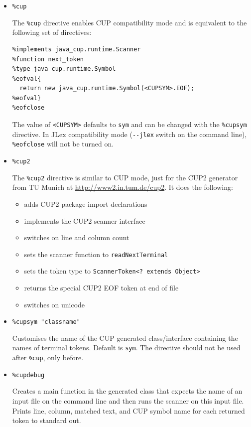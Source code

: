 \begin{itemize}
\item
  \texttt{\%cup}

  The \texttt{\%cup} directive enables CUP compatibility mode and is
  equivalent to the following set of directives:

\begin{verbatim}
%implements java_cup.runtime.Scanner
%function next_token
%type java_cup.runtime.Symbol
%eofval{
  return new java_cup.runtime.Symbol(<CUPSYM>.EOF);
%eofval}
%eofclose
\end{verbatim}

  The value of \texttt{\textless{}CUPSYM\textgreater{}} defaults to
  \texttt{sym} and can be changed with the \texttt{\%cupsym} directive.
  In JLex compatibility mode (\texttt{-\/-jlex} switch on the command
  line), \texttt{\%eofclose} will not be turned on.
\item
  \texttt{\%cup2}

  The \texttt{\%cup2} directive is similar to CUP mode, just for the
  CUP2 generator from TU Munich at \url{http://www2.in.tum.de/cup2}. It
  does the following:

  \begin{itemize}
  \itemsep1pt\parskip0pt
  \item
    adds CUP2 package import declarations
  \item
    implements the CUP2 scanner interface
  \item
    switches on line and column count
  \item
    sets the scanner function to \texttt{readNextTerminal}
  \item
    sets the token type to
    \texttt{ScannerToken\textless{}?\ extends\ Object\textgreater{}}
  \item
    returns the special CUP2 EOF token at end of file
  \item
    switches on unicode
  \end{itemize}
\item
  \texttt{\%cupsym\ "classname"}

  Customises the name of the CUP generated class/interface containing
  the names of terminal tokens. Default is \texttt{sym}. The directive
  should not be used after \texttt{\%cup}, only before. 
\item
  \texttt{\%cupdebug}

  Creates a main function in the generated class that expects the name
  of an input file on the command line and then runs the scanner on this
  input file. Prints line, column, matched text, and CUP symbol name for
  each returned token to standard out.
\end{itemize}

